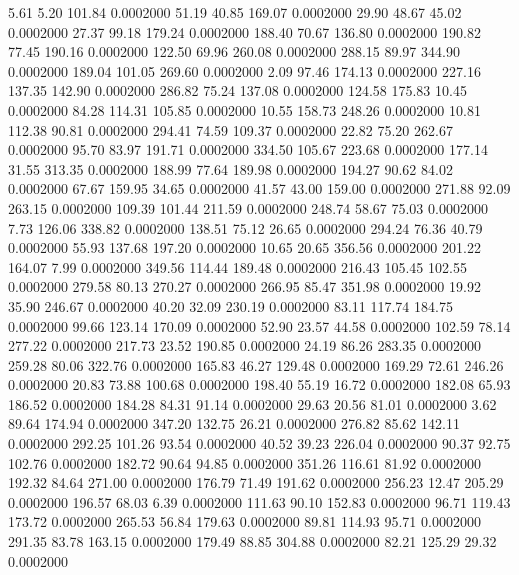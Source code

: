    5.61    5.20  101.84   0.0002000
  51.19   40.85  169.07   0.0002000
  29.90   48.67   45.02   0.0002000
  27.37   99.18  179.24   0.0002000
 188.40   70.67  136.80   0.0002000
 190.82   77.45  190.16   0.0002000
 122.50   69.96  260.08   0.0002000
 288.15   89.97  344.90   0.0002000
 189.04  101.05  269.60   0.0002000
   2.09   97.46  174.13   0.0002000
 227.16  137.35  142.90   0.0002000
 286.82   75.24  137.08   0.0002000
 124.58  175.83   10.45   0.0002000
  84.28  114.31  105.85   0.0002000
  10.55  158.73  248.26   0.0002000
  10.81  112.38   90.81   0.0002000
 294.41   74.59  109.37   0.0002000
  22.82   75.20  262.67   0.0002000
  95.70   83.97  191.71   0.0002000
 334.50  105.67  223.68   0.0002000
 177.14   31.55  313.35   0.0002000
 188.99   77.64  189.98   0.0002000
 194.27   90.62   84.02   0.0002000
  67.67  159.95   34.65   0.0002000
  41.57   43.00  159.00   0.0002000
 271.88   92.09  263.15   0.0002000
 109.39  101.44  211.59   0.0002000
 248.74   58.67   75.03   0.0002000
   7.73  126.06  338.82   0.0002000
 138.51   75.12   26.65   0.0002000
 294.24   76.36   40.79   0.0002000
  55.93  137.68  197.20   0.0002000
  10.65   20.65  356.56   0.0002000
 201.22  164.07    7.99   0.0002000
 349.56  114.44  189.48   0.0002000
 216.43  105.45  102.55   0.0002000
 279.58   80.13  270.27   0.0002000
 266.95   85.47  351.98   0.0002000
  19.92   35.90  246.67   0.0002000
  40.20   32.09  230.19   0.0002000
  83.11  117.74  184.75   0.0002000
  99.66  123.14  170.09   0.0002000
  52.90   23.57   44.58   0.0002000
 102.59   78.14  277.22   0.0002000
 217.73   23.52  190.85   0.0002000
  24.19   86.26  283.35   0.0002000
 259.28   80.06  322.76   0.0002000
 165.83   46.27  129.48   0.0002000
 169.29   72.61  246.26   0.0002000
  20.83   73.88  100.68   0.0002000
 198.40   55.19   16.72   0.0002000
 182.08   65.93  186.52   0.0002000
 184.28   84.31   91.14   0.0002000
  29.63   20.56   81.01   0.0002000
   3.62   89.64  174.94   0.0002000
 347.20  132.75   26.21   0.0002000
 276.82   85.62  142.11   0.0002000
 292.25  101.26   93.54   0.0002000
  40.52   39.23  226.04   0.0002000
  90.37   92.75  102.76   0.0002000
 182.72   90.64   94.85   0.0002000
 351.26  116.61   81.92   0.0002000
 192.32   84.64  271.00   0.0002000
 176.79   71.49  191.62   0.0002000
 256.23   12.47  205.29   0.0002000
 196.57   68.03    6.39   0.0002000
 111.63   90.10  152.83   0.0002000
  96.71  119.43  173.72   0.0002000
 265.53   56.84  179.63   0.0002000
  89.81  114.93   95.71   0.0002000
 291.35   83.78  163.15   0.0002000
 179.49   88.85  304.88   0.0002000
  82.21  125.29   29.32   0.0002000
